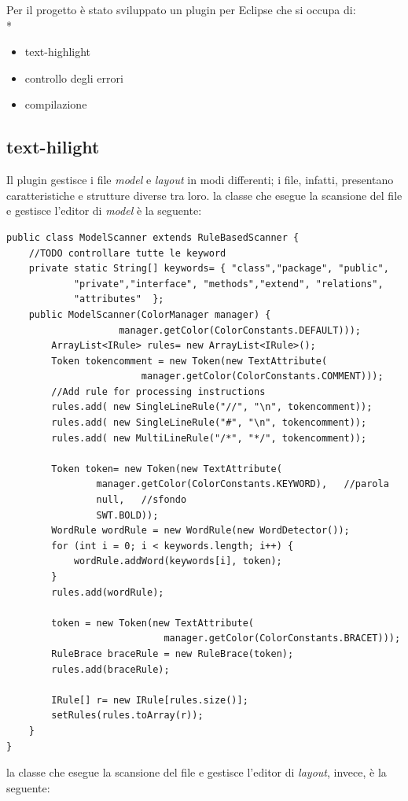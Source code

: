 Per il progetto è stato sviluppato un plugin per Eclipse che si occupa di: \\*
\begin{itemize}
  \item text-highlight
  \item controllo degli errori
  \item compilazione
\end{itemize} 


\subsection{text-hilight}
Il plugin gestisce i file \emph{model} e \emph{layout} in modi differenti; i 
file, infatti, presentano caratteristiche e strutture diverse tra loro.
la classe che esegue la scansione del file e gestisce l'editor di \emph{model} è
la seguente:

\begin{lstlisting}[caption={ModelScanner}, style={java}]
public class ModelScanner extends RuleBasedScanner {
	//TODO controllare tutte le keyword
	private static String[] keywords= { "class","package", "public",
			"private","interface", "methods","extend", "relations", 
			"attributes"  };
	public ModelScanner(ColorManager manager) {
					manager.getColor(ColorConstants.DEFAULT)));
		ArrayList<IRule> rules= new ArrayList<IRule>();	
		Token tokencomment = new Token(new TextAttribute(
						manager.getColor(ColorConstants.COMMENT)));
		//Add rule for processing instructions
		rules.add( new SingleLineRule("//", "\n", tokencomment));
		rules.add( new SingleLineRule("#", "\n", tokencomment));
		rules.add( new MultiLineRule("/*", "*/", tokencomment));
		
		Token token= new Token(new TextAttribute(
				manager.getColor(ColorConstants.KEYWORD), 	//parola
				null, 	//sfondo
				SWT.BOLD));
		WordRule wordRule = new WordRule(new WordDetector());
		for (int i = 0; i < keywords.length; i++) {
			wordRule.addWord(keywords[i], token);
		}		
		rules.add(wordRule);
		
		token = new Token(new TextAttribute(
							manager.getColor(ColorConstants.BRACET)));
		RuleBrace braceRule = new RuleBrace(token);
		rules.add(braceRule);
		
		IRule[] r= new IRule[rules.size()];
		setRules(rules.toArray(r));
	}
}
\end{lstlisting}

la classe che esegue la scansione del file e gestisce l'editor di \emph{layout},
invece, è la seguente:

